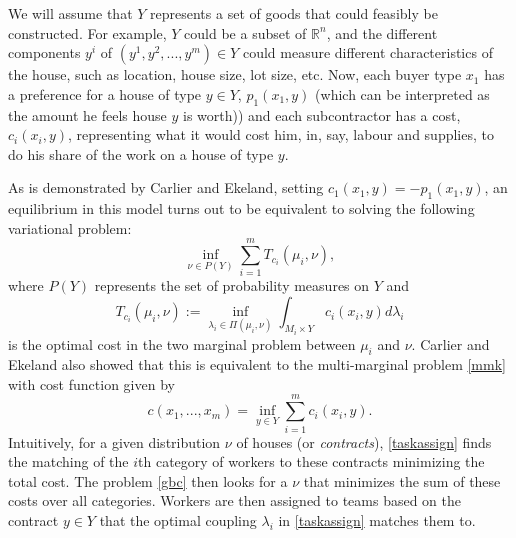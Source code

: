 \documentclass[letter,10pt]{article}
\theoremstyle{dotless}
\begin{document}
We will assume that $Y$ represents a set of goods that could feasibly be constructed.  For example, $Y$ could be a subset of $\mathbb{R}^n$, and the different components $y^i$ of $(y^1,y^2,...,y^m) \in Y$ could measure different characteristics of the house, such as location, house size, lot size, etc.    Now, each buyer type $x_1$  has a preference for a  house of type $y \in Y$, $p_1(x_1,y)$ (which can be interpreted as the amount he feels house $y$ is worth)) and each subcontractor has a cost, $c_i(x_i,y)$, representing what it would cost him, in, say, labour and supplies, to do his share of the work on a house of type $y$.  

As is demonstrated by Carlier and Ekeland, setting $c_1(x_1,y)=-p_1(x_1,y)$, an equilibrium in this model turns out to be equivalent to solving the following variational problem:
\begin{equation}\label{gbc}
\inf_{\nu \in P(Y)} \sum_{i=1}^m T_{c_i}(\mu_i,\nu),
\end{equation}
 where $P(Y)$ represents the set of probability measures on $Y$ and 
\begin{equation}\label{taskassign}
T_{c_i}(\mu_i,\nu) :=\inf_{\lambda_i \in \Pi(\mu_i,\nu)} \int_{M_i \times Y} c_i(x_i,y)d\lambda_i
\end{equation}
is the optimal cost in the two marginal problem between $\mu_i$ and $\nu$.  Carlier and Ekeland also showed that this is equivalent to the multi-marginal problem \eqref{mmk} with cost function given by
\begin{equation}\label{matchingcost}
c(x_1,...,x_m) = \inf_{y \in Y} \sum_{i=1}^m c_i(x_i,y).
\end{equation}
Intuitively, for a given  distribution $\nu$ of houses (or \textit{contracts}), \eqref{taskassign} finds the matching of the $i$th category of workers to these contracts minimizing the total cost.  The problem \eqref{gbc} then looks for a $\nu$ that minimizes the sum of these costs over all categories.  Workers are then assigned to teams based on the contract $y \in Y$ that the optimal coupling $\lambda_i$ in \eqref{taskassign} matches them to. 
\end{document}
